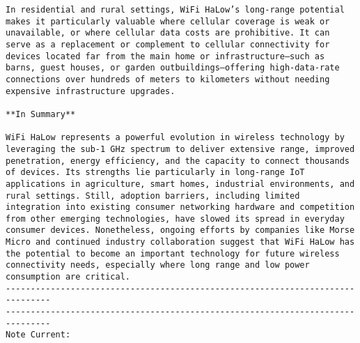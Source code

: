 \begin{verbatim}
In residential and rural settings, WiFi HaLow’s long-range potential makes it particularly valuable where cellular coverage is weak or unavailable, or where cellular data costs are prohibitive. It can serve as a replacement or complement to cellular connectivity for devices located far from the main home or infrastructure—such as barns, guest houses, or garden outbuildings—offering high-data-rate connections over hundreds of meters to kilometers without needing expensive infrastructure upgrades.

**In Summary**

WiFi HaLow represents a powerful evolution in wireless technology by leveraging the sub-1 GHz spectrum to deliver extensive range, improved penetration, energy efficiency, and the capacity to connect thousands of devices. Its strengths lie particularly in long-range IoT applications in agriculture, smart homes, industrial environments, and rural settings. Still, adoption barriers, including limited integration into existing consumer networking hardware and competition from other emerging technologies, have slowed its spread in everyday consumer devices. Nonetheless, ongoing efforts by companies like Morse Micro and continued industry collaboration suggest that WiFi HaLow has the potential to become an important technology for future wireless connectivity needs, especially where long range and low power consumption are critical.
-------------------------------------------------------------------------------
-------------------------------------------------------------------------------
Note Current:
			

\end{verbatim}
